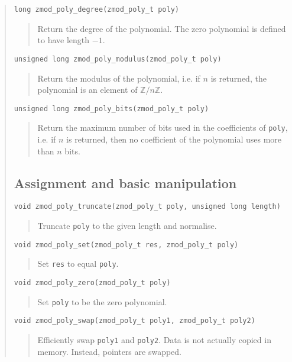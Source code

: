\documentclass[a4paper,10pt]{article}
\newcommand{\Z}{\mathbb{Z}}
\newcommand{\code}{\lstinline}
\begin{document}
\begin{quote}
\begin{lstlisting}
long zmod_poly_degree(zmod_poly_t poly)
\end{lstlisting}
\begin{quote}
Return the degree of the polynomial. The zero polynomial is defined to have length $-1$.
\end{quote}

\begin{lstlisting}
unsigned long zmod_poly_modulus(zmod_poly_t poly)
\end{lstlisting}
\begin{quote}
Return the modulus of the polynomial, i.e. if $n$ is returned, the polynomial is an element of $\Z/n\Z$.\end{quote}

\begin{lstlisting}
unsigned long zmod_poly_bits(zmod_poly_t poly)
\end{lstlisting}
\begin{quote}
Return the maximum number of bits used in the coefficients of \code{poly}, i.e. if $n$ is returned, then no coefficient of the polynomial uses more than $n$ bits.\end{quote}

\subsection{Assignment and basic manipulation}
\begin{lstlisting}
void zmod_poly_truncate(zmod_poly_t poly, unsigned long length)
\end{lstlisting}
\begin{quote}
Truncate \code{poly} to the given length and normalise.
\end{quote}

\begin{lstlisting}
void zmod_poly_set(zmod_poly_t res, zmod_poly_t poly)
\end{lstlisting}
\begin{quote}
Set \code{res} to equal \code{poly}.
\end{quote}

\begin{lstlisting}
void zmod_poly_zero(zmod_poly_t poly)
\end{lstlisting}
\begin{quote}
Set \code{poly} to be the zero polynomial.
\end{quote}

\begin{lstlisting}
void zmod_poly_swap(zmod_poly_t poly1, zmod_poly_t poly2)
\end{lstlisting}
\begin{quote}
Efficiently swap \code{poly1} and \code{poly2}. Data is not actually copied in memory. Instead, pointers are swapped.
\end{quote}


\end{quote}
\end{document}
